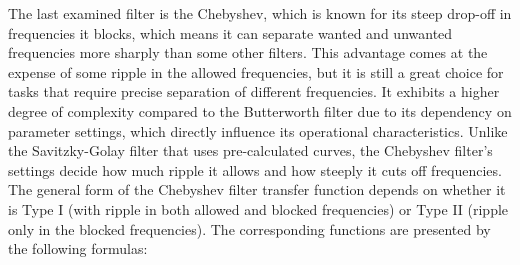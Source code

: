 The last examined filter is the Chebyshev, which is known for its steep drop-off in frequencies it blocks, which means it can separate wanted and unwanted frequencies more sharply than some other filters.
This advantage comes at the expense of some ripple in the allowed frequencies, but it is still a great choice for tasks that require precise separation of different frequencies.
It exhibits a higher degree of complexity compared to the Butterworth filter due to its dependency on parameter settings, which directly influence its operational characteristics.
Unlike the Savitzky-Golay filter that uses pre-calculated curves, the Chebyshev filter's settings decide how much ripple it allows and how steeply it cuts off frequencies.
The general form of the Chebyshev filter transfer function depends on whether it is Type I (with ripple in both allowed and blocked frequencies) or Type II (ripple only in the blocked frequencies).
The corresponding functions are presented by the following formulas:


